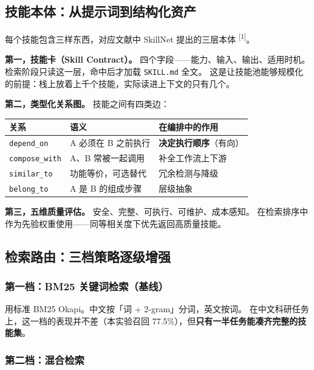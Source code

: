 \documentclass[UTF8, fontset=windows, 11pt, a4paper]{ctexart}
\begin{document}
\subsection{技能本体：从提示词到结构化资产}

每个技能包含三样东西，对应文献中 SkillNet 提出的三层本体
\textsuperscript{[1]}。

\textbf{第一，技能卡（Skill Contract）。} 四个字段——能力、输入、输出、适用时机。
检索阶段只读这一层，命中后才加载 \texttt{SKILL.md} 全文。
这是让技能池能够规模化的前提：栈上放着上千个技能，实际读进上下文的只有几个。

\textbf{第二，类型化关系图。} 技能之间有四类边：

\begin{center}
\small
\begin{tabular}{@{}lll@{}}
\toprule
\textbf{关系} & \textbf{语义} & \textbf{在编排中的作用} \\
\midrule
\texttt{depend\_on} & A 必须在 B 之前执行 & \textbf{决定执行顺序}（有向） \\
\texttt{compose\_with} & A、B 常被一起调用 & 补全工作流上下游 \\
\texttt{similar\_to} & 功能等价，可选替代 & 冗余检测与降级 \\
\texttt{belong\_to} & A 是 B 的组成步骤 & 层级抽象 \\
\bottomrule
\end{tabular}
\end{center}

\textbf{第三，五维质量评估。} 安全、完整、可执行、可维护、成本感知。
在检索排序中作为先验权重使用——同等相关度下优先返回高质量技能。

\subsection{检索路由：三档策略逐级增强}

\subsubsection*{第一档：BM25 关键词检索（基线）}

用标准 BM25 Okapi。中文按「词 + 2-gram」分词，英文按词。
在中文科研任务上，这一档的表现并不差（本实验召回 77.5\%），但\textbf{只有一半任务能凑齐完整的技能集}。

\subsubsection*{第二档：混合检索}
\end{document}
